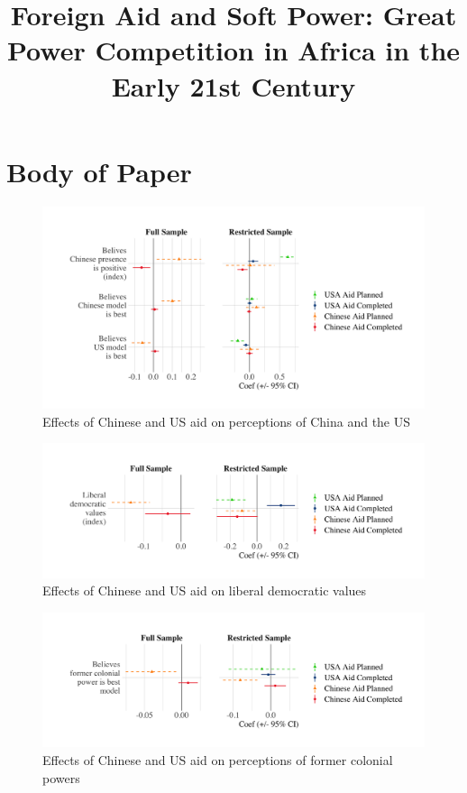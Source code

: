 \documentclass[9pt]{article}
\title{Foreign Aid and Soft Power: Great Power Competition in Africa in the Early 21st Century}
\begin{document}
\maketitle
\tableofcontents

\setlength{\tabcolsep}{5pt}

\newpage
\section{Body of Paper}

\begin{figure}[H]
\centering
\includegraphics[width=1\textwidth]{figures/figure_01.png}
\caption{Effects of Chinese and US aid on perceptions of China and the US}
\end{figure}

\begin{figure}[H]
\centering
\includegraphics[width=1\textwidth]{figures/figure_02.png}
\caption{Effects of Chinese and US aid on liberal democratic values}
\end{figure}

\begin{figure}[H]
\centering
\includegraphics[width=1\textwidth]{figures/figure_03.png}
\caption{Effects of Chinese and US aid on perceptions of former colonial powers}
\end{figure}
\end{document}
